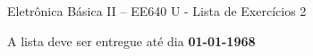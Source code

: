 \documentclass[addpoints]{exam}
\begin{document}
 
\begin{center}
Eletrônica Básica II – EE640 U - Lista de Exercícios 2
\end{center}
 
\vspace{5mm}
 
\hfill
{}

\begin{center}
A lista deve ser entregue até dia \textbf{01-01-1968}
\end{center}

\hspace{2mm}

\begin{center}
\gradetable[h][questions]
\end{center}

\hspace{2mm}
\end{document}
